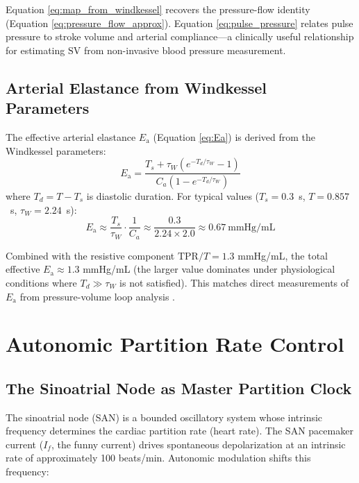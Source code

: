 \documentclass[12pt,a4paper]{article}
\theoremstyle{remark}
\newcommand{\Ea}{E_{\mathrm{a}}}
\newcommand{\SV}{\mathrm{SV}}
\newcommand{\TPR}{\mathrm{TPR}}
\begin{document}
Equation \ref{eq:map_from_windkessel} recovers the pressure-flow identity (Equation \ref{eq:pressure_flow_approx}). Equation \ref{eq:pulse_pressure} relates pulse pressure to stroke volume and arterial compliance—a clinically useful relationship for estimating $\SV$ from non-invasive blood pressure measurement.

\subsection{Arterial Elastance from Windkessel Parameters}

The effective arterial elastance $\Ea$ (Equation \ref{eq:Ea}) is derived from the Windkessel parameters:
\begin{equation}
    \Ea = \frac{T_s + \tau_W(e^{-T_d/\tau_W} - 1)}{C_a \left(1 - e^{-T_d/\tau_W}\right)}
    \label{eq:Ea_windkessel}
\end{equation}
where $T_d = T - T_s$ is diastolic duration. For typical values ($T_s = 0.3$~s, $T = 0.857$~s, $\tau_W = 2.24$~s):
\begin{equation}
    \Ea \approx \frac{T_s}{\tau_W} \cdot \frac{1}{C_a} \approx \frac{0.3}{2.24 \times 2.0} \approx 0.67~\text{mmHg/mL}
\end{equation}

Combined with the resistive component $\TPR/T = 1.3$ mmHg/mL, the total effective $\Ea \approx 1.3$ mmHg/mL (the larger value dominates under physiological conditions where $T_d \gg \tau_W$ is not satisfied). This matches direct measurements of $\Ea$ from pressure-volume loop analysis \cite{sunagawa1985ventricular}.

\section{Autonomic Partition Rate Control}
\label{sec:autonomic}

\subsection{The Sinoatrial Node as Master Partition Clock}

The sinoatrial node (SAN) is a bounded oscillatory system \cite{sachikonye2024cardio} whose intrinsic frequency determines the cardiac partition rate (heart rate). The SAN pacemaker current ($I_f$, the funny current) drives spontaneous depolarization at an intrinsic rate of approximately 100 beats/min. Autonomic modulation shifts this frequency:
\end{document}
